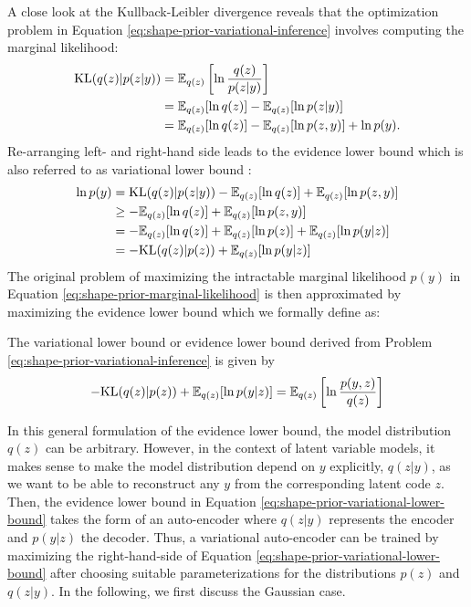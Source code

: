A close look at the Kullback-Leibler
divergence reveals that the optimization problem in Equation
\eqref{eq:shape-prior-variational-inference}
involves computing the marginal likelihood:
\begin{align}
  \mathrm{KL}(q(z) | p(z|y)) &= \mathbb{E}_{q(z)}\left[\ln\frac{q(z)}{p(z|y)}\right]\label{eq:shape-prior-variational-inference-kl}\\
   &= \mathbb{E}_{q(z)}[\ln q(z)] - \mathbb{E}_{q(z)}[\ln p(z|y)]\\
   &= \mathbb{E}_{q(z)}[\ln q(z)] - \mathbb{E}_{q(z)}[\ln p(z,y)] + \ln p(y).
\end{align}
Re-arranging left- and right-hand side leads to the evidence lower bound which is also
referred to as variational lower bound \cite{BleiKucukelbirMcAuliffe:2016}:
\begin{align}
  \ln p(y) &= \mathrm{KL}(q(z) | p(z|y)) - \mathbb{E}_{q(z)}[\ln q(z)] + \mathbb{E}_{q(z)}[\ln p(z,y)]\\
  &\geq - \mathbb{E}_{q(z)}[\ln q(z)] + \mathbb{E}_{q(z)}[\ln p(z,y)]\\
  &= - \mathbb{E}_{q(z)}[\ln q(z)] + \mathbb{E}_{q(z)}[\ln p(z)] + \mathbb{E}_{q(z)}[\ln p(y|z)]\\
  &= - \mathrm{KL}(q(z) | p(z)) + \mathbb{E}_{q(z)}[\ln p(y|z)]
\end{align}
The original problem of maximizing the intractable marginal likelihood $p(y)$ in Equation
\eqref{eq:shape-prior-marginal-likelihood} is then approximated
by maximizing the evidence lower bound which we formally define as:

\begin{definition}
  The variational lower bound or evidence lower bound derived from Problem
  \eqref{eq:shape-prior-variational-inference} is given by
  \begin{align}
    - \mathrm{KL}(q(z) | p(z)) + \mathbb{E}_{q(z)}[\ln p(y|z)]
    = \mathbb{E}_{q(z)}\left[\ln\frac{p(y, z)}{q(z)}\right]
    \label{eq:shape-prior-variational-lower-bound}
  \end{align}
\end{definition}

In this general formulation of the evidence lower bound, the model distribution
$q(z)$ can be arbitrary. However, in the context of latent variable models,
it makes sense to make the model distribution depend on $y$ explicitly, \ie $q(z | y)$,
as we want to be able to reconstruct any $y$ from the corresponding latent code $z$.
Then, the evidence lower bound in Equation \eqref{eq:shape-prior-variational-lower-bound}
takes the form of an auto-encoder where
$q(z | y)$ represents the encoder and $p(y | z)$ the decoder.
Thus, a variational auto-encoder can be trained by maximizing the right-hand-side
of Equation \eqref{eq:shape-prior-variational-lower-bound}
after choosing suitable parameterizations for the distributions $p(z)$ and $q(z | y)$.
In the following, we first discuss the Gaussian case.

